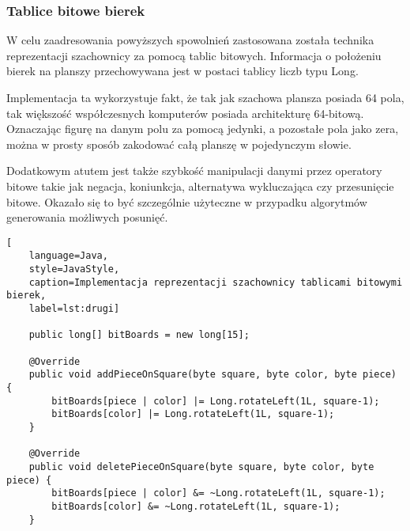\subsubsection{Tablice bitowe bierek}

W celu zaadresowania powyższych spowolnień zastosowana została technika reprezentacji szachownicy za pomocą tablic bitowych.
Informacja o położeniu bierek na planszy przechowywana jest w postaci tablicy liczb typu Long.

Implementacja ta wykorzystuje fakt, że tak jak szachowa plansza posiada 64 pola, tak większość współczesnych komputerów posiada architekturę 64-bitową.
Oznaczając figurę na danym polu za pomocą jedynki, a pozostałe pola jako zera, można w prosty sposób zakodować całą planszę w pojedynczym słowie.

Dodatkowym atutem jest także szybkość manipulacji danymi przez operatory bitowe takie jak negacja, koniunkcja, alternatywa wykluczająca czy przesunięcie bitowe.
Okazało się to być szczególnie użyteczne w przypadku algorytmów generowania możliwych posunięć.
\begin{lstlisting}[
    language=Java,
    style=JavaStyle,
    caption=Implementacja reprezentacji szachownicy tablicami bitowymi bierek,
    label=lst:drugi]

    public long[] bitBoards = new long[15];

    @Override
    public void addPieceOnSquare(byte square, byte color, byte piece) {
        bitBoards[piece | color] |= Long.rotateLeft(1L, square-1);
        bitBoards[color] |= Long.rotateLeft(1L, square-1);
    }

    @Override
    public void deletePieceOnSquare(byte square, byte color, byte piece) {
        bitBoards[piece | color] &= ~Long.rotateLeft(1L, square-1);
        bitBoards[color] &= ~Long.rotateLeft(1L, square-1);
    }

\end{lstlisting}

